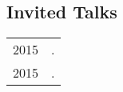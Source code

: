 \documentclass[11pt,letterpaper,twoside]{article}
\makeatletter
\newcommand{\name}{Brian Buccola}
\newcommand{\myvrule}{\color{lightgray}\vrule width 1.0pt}
\newenvironment{cvsection}{%
  \renewcommand{\arraystretch}{1.75}
  \begin{longtable}[l]{@{} L R @{}}
}{%
  \end{longtable}
}
\makeatother
\begin{document}
\clearpage

\subsection*{Invited Talks}

\begin{cvsection}
  2015 & \null{}. \\
  2015 & \null{}. \\
\end{cvsection}

%
%
%
%
%
%
%
%
%
%
\end{document}
